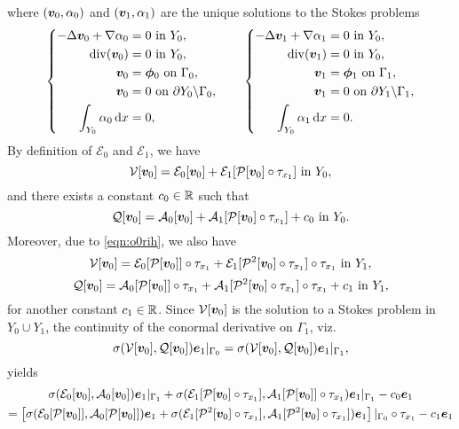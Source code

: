 \documentclass[a4paper,10pt,reqno]{amsart}
\begin{document}
where $({\bm v}_0,\alpha_0)$ and $({\bm v}_1,\alpha_1)$ are the unique solutions to the Stokes
problems
\[
    \left\{\begin{aligned}
    -\Delta  {\bm v}_0 + \nabla \alpha_0 &= 0 \textrm{ in } Y_0,\\  
    \mathrm{div}({\bm v}_0) &= 0 \textrm{ in } Y_0,\\  
    {\bm v}_0 &= \bm\phi_0 \textrm{ on } \Gamma_0,\\    
    {\bm v}_0 &=  0 \textrm{ on } \partial Y_0\backslash\Gamma_0,  \\
    \int_{Y_0}\alpha_0\,\mathrm{d} x &= 0,
    \end{aligned}
    \right.\qquad 
\left\{\begin{aligned}
    -\Delta  {\bm v}_1 + \nabla \alpha_1 &= 0 \textrm{ in } Y_0,\\  
    \mathrm{div}({\bm v}_1) &= 0 \textrm{ in } Y_0,\\  
    {\bm v}_1 &= \bm\phi_1 \textrm{ on } \Gamma_1,\\    
    {\bm v}_1 &=  0 \textrm{ on } \partial Y_1\backslash\Gamma_1,  \\
    \int_{Y_0}\alpha_1\,\mathrm{d} x &= 0.
    \end{aligned}
    \right.
\] 
By definition of $\mathcal{E}_0$ and $\mathcal{E}_1$, we have     
\[
    \mathcal{V}[\v_0]=\mathcal{E}_0[\v_0]+\mathcal{E}_1[\mathcal{P}[\v_0]\circ \tau_{x_1}]
    \In Y_0,
\] 
and there exists a constant $c_0\in\mathbb{R}$ such that   
\[
    \mathcal{Q}[\v_0]=\mathcal{A}_0[\v_0]+\mathcal{A}_1[\mathcal{P}[\v_0]\circ\tau_{x_1}]+c_0\In
    Y_0.
\] 
Moreover, due to \cref{eqn:o0rih}, we also have
\[
    \mathcal{V}[\v_0]=\mathcal{E}_0[\mathcal{P}[\v_0]]\circ \tau_{x_1} +
    \mathcal{E}_1[\mathcal{P}^{2}[\v_0]\circ\tau_{x_1}]\circ \tau_{x_1} \In Y_1,
\] 
\[
    \mathcal{Q}[\v_0]=\mathcal{A}_0[\mathcal{P}[\v_0]]\circ \tau_{x_1} +
    \mathcal{A}_1[\mathcal{P}^{2}[\v_0]\circ\tau_{x_1}]\circ \tau_{x_1}+c_1 \In Y_1,
\] 
for another constant $c_1\in\mathbb{R}$.
Since $\mathcal{V}[{\bm v}_0]$ is the solution to a Stokes problem in $Y_0\cup Y_1$,
the continuity of the conormal derivative on $\Gamma_1$, viz.
\[
    \sigma(\mathcal{V}[{\bm v}_0],\mathcal{Q}[{\bm v}_0]){\bm e}_1\vert_{\Gamma_0} =
    \sigma(\mathcal{V}[{\bm v}_0],\mathcal{Q}[{\bm v}_0]){\bm e}_1\vert_{\Gamma_1},
\]  
yields  
\begin{multline}
    \label{eqn:6yer5}
    \sigma(\mathcal{E}_0[\v_0],\mathcal{A}_0[\v_0])\e_1\vert_{\Gamma_1}    
    +\sigma(\mathcal{E}_1[\mathcal{P}[\v_0]\circ
    \tau_{x_1}],\mathcal{A}_1[\mathcal{P}[\v_0]]\circ\tau_{x_1})\e_1\vert_{\Gamma_1}    
    -c_0\e_1\\  
    =\left[\sigma(\mathcal{E}_0[\mathcal{P}[\v_0]],\mathcal{A}_0[\mathcal{P}[\v_0]])\e_1   
    +\sigma(\mathcal{E}_1[\mathcal{P}^{2}[\v_0]\circ\tau_{x_1}],
    \mathcal{A}_1[\mathcal{P}^{2}[\v_0]\circ\tau_{x_1}])\e_1\right]\vert_{\Gamma_0}\circ\tau_{x_1}-c_1\e_1
\end{multline} 
\end{document}
